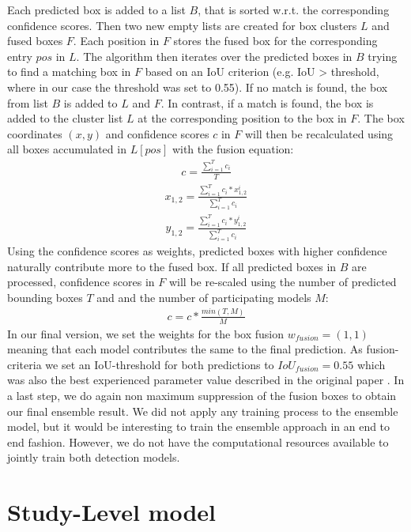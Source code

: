 Each predicted box is added to a list $B$, that is sorted w.r.t. the corresponding confidence scores. Then two new empty lists are created for box clusters $L$ and fused boxes $F$. Each position in $F$ stores the fused box for the corresponding entry $pos$ in $L$. The algorithm then iterates over the predicted boxes in $B$ trying to find a matching box in $F$ based on an \acs{IoU} criterion (e.g. \acs{IoU} > threshold, where in our case the threshold was set to 0.55). If no match is found, the box from list $B$ is added to $L$ and $F$. In contrast, if a match is found, the box is added to the cluster list $L$ at the corresponding position to the box in $F$. The box coordinates $(x,y)$ and confidence scores $c$ in $F$ will then be recalculated using all boxes accumulated in $L[pos]$ with the fusion equation:
\begin{align}
	c = \frac{\sum_{i=1}^{T}c_i}{T}
\end{align}
\begin{align}
	x_{1,2} = \frac{\sum_{i=1}^{T} c_i * x_{1,2}^i}{\sum_{i=1}^{T} c_i}
\end{align}
\begin{align}
	y_{1,2} = \frac{\sum_{i=1}^{T} c_i * y_{1,2}^i}{\sum_{i=1}^{T} c_i}
\end{align}
Using the confidence scores as weights, predicted boxes with higher confidence naturally contribute more to the fused box.
If all predicted boxes in $B$ are processed, confidence scores in $F$ will be re-scaled using the number of predicted bounding boxes $T$ and and the number of participating models $M$:
\begin{align}
	c = c * \frac{min(T,M)}{M}
\end{align}
In our final version, we set the weights for the box fusion $w_{fusion} = (1,1)$ meaning that each model contributes the same to the final prediction.
As fusion-criteria we set an \ac{IoU}-threshold for both predictions to $IoU_{fusion} = 0.55$ which was also the best experienced parameter value described in the original paper \autocite{weightedBoxFusion}. In a last step, we do again non maximum suppression of the fusion boxes to obtain our final ensemble result. 
We did not apply any training process to the ensemble model, but it would be interesting to train the ensemble approach in an end to end fashion. However, we do not have the computational resources available to jointly train both detection models.



\section{Study-Level model}

